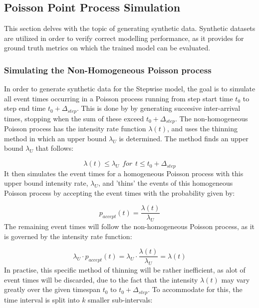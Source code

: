 \subsection{Poisson Point Process Simulation}
\label{sec:Method:PoissonSimulation}
This section delves with the topic of generating synthetic data.
Synthetic datasets are utilized in order to verify correct modelling performance, as it provides for ground truth metrics on which the trained model can be evaluated.


\subsubsection{Simulating the Non-Homogeneous Poisson process}
\label{sec:Method:PoissonSimulation:NonHomogeneous}
In order to generate synthetic data for the Stepwise model, the goal is to simulate all event times occurring in a Poisson process running from step start time $t_0$ to step end time $t_0 + \Delta_{step}$.
This is done by by generating succesive inter-arrival times, stopping when the sum of these exceed $t_0 + \Delta_{step}$.
The non-homogeneous Poisson process has the intensity rate function $\lambda(t)$, and uses the thinning method in which an upper bound $\lambda_U$ is determined.
The method finds an upper bound $\lambda_U$ that follows:

\begin{equation}
    \lambda(t) \leq \lambda_U \hspace{5pt} for \hspace{5pt} t \leq t_0 + \Delta_{step}
\end{equation}
It then simulates the event times for a homogeneous Poisson process with this upper bound intensity rate, $\lambda_U$, and 'thins' the events of this homogeneous Poisson process by accepting the event times with the probability given by:

\begin{equation}
    p_{accept}(t) = \frac{\lambda(t)}{\lambda_U}
\end{equation}
The remaining event times will follow the non-homogeneous Poisson process, as it is governed by the intensity rate function:

\begin{equation}
    \lambda_U \cdot p_{accept}(t) = \lambda_U \cdot \frac{\lambda(t)}{\lambda_U} = \lambda(t)
\end{equation}
In practise, this specific method of thinning will be rather inefficient, as alot of event times will be discarded, due to the fact that the intensity $\lambda(t)$ may vary greatly over the given timespan $t_0$ to $t_0 + \Delta_{step}$.
To accommodate for this, the time interval is split into $k$ smaller sub-intervals:

